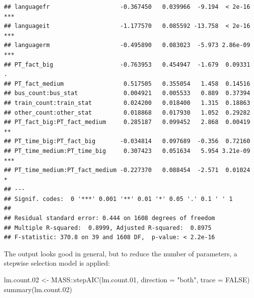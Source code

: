 \documentclass[
]{article}
\newenvironment{Shaded}{\begin{snugshade}}{\end{snugshade}}
\newcommand{\AttributeTok}[1]{\textcolor[rgb]{0.77,0.63,0.00}{#1}}
\newcommand{\ConstantTok}[1]{\textcolor[rgb]{0.00,0.00,0.00}{#1}}
\newcommand{\FloatTok}[1]{\textcolor[rgb]{0.00,0.00,0.81}{#1}}
\newcommand{\FunctionTok}[1]{\textcolor[rgb]{0.00,0.00,0.00}{#1}}
\newcommand{\NormalTok}[1]{#1}
\newcommand{\OtherTok}[1]{\textcolor[rgb]{0.56,0.35,0.01}{#1}}
\newcommand{\SpecialCharTok}[1]{\textcolor[rgb]{0.00,0.00,0.00}{#1}}
\newcommand{\StringTok}[1]{\textcolor[rgb]{0.31,0.60,0.02}{#1}}
\begin{document}
\begin{verbatim}
## languagefr                    -0.367450   0.039966  -9.194  < 2e-16 ***
## languageit                    -1.177570   0.085592 -13.758  < 2e-16 ***
## languagerm                    -0.495890   0.083023  -5.973 2.86e-09 ***
## PT_fact_big                   -0.763953   0.454947  -1.679  0.09331 .  
## PT_fact_medium                 0.517505   0.355054   1.458  0.14516    
## bus_count:bus_stat             0.004921   0.005533   0.889  0.37394    
## train_count:train_stat         0.024200   0.018400   1.315  0.18863    
## other_count:other_stat         0.018868   0.017930   1.052  0.29282    
## PT_fact_big:PT_fact_medium     0.285187   0.099452   2.868  0.00419 ** 
## PT_time_big:PT_fact_big       -0.034814   0.097689  -0.356  0.72160    
## PT_time_medium:PT_time_big     0.307423   0.051634   5.954 3.21e-09 ***
## PT_time_medium:PT_fact_medium -0.227370   0.088454  -2.571  0.01024 *  
## ---
## Signif. codes:  0 '***' 0.001 '**' 0.01 '*' 0.05 '.' 0.1 ' ' 1
## 
## Residual standard error: 0.444 on 1608 degrees of freedom
## Multiple R-squared:  0.8999, Adjusted R-squared:  0.8975 
## F-statistic: 370.8 on 39 and 1608 DF,  p-value: < 2.2e-16
\end{verbatim}

The output looks good in general, but to reduce the number of
parameters, a stepwise selection model is applied:

\begin{Shaded}
\begin{Highlighting}[]
\NormalTok{lm.count}\FloatTok{.02} \OtherTok{\textless{}{-}}\NormalTok{ MASS}\SpecialCharTok{::}\FunctionTok{stepAIC}\NormalTok{(lm.count}\FloatTok{.01}\NormalTok{, }\AttributeTok{direction =} \StringTok{"both"}\NormalTok{, }\AttributeTok{trace =} \ConstantTok{FALSE}\NormalTok{)}
\FunctionTok{summary}\NormalTok{(lm.count}\FloatTok{.02}\NormalTok{)}
\end{Highlighting}
\end{Shaded}
\end{document}
